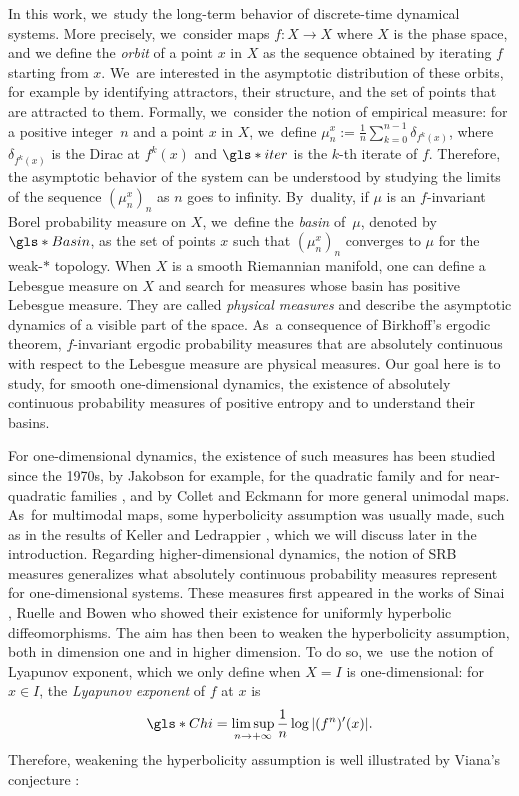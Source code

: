 \documentclass[11pt]{article}
\theoremstyle{definition}
\begin{document}
In this work, we~study the long-term behavior of discrete-time dynamical systems.
More precisely, we~consider maps $f : X \to X$ where $X$ is the phase space,
and we define the \textit{orbit} of a point $x$ in $X$ as the sequence obtained by iterating $f$ starting from $x$. We~are interested in the asymptotic distribution of these orbits, for \hbox{example} by identifying attractors, their structure, and the set of points that are attracted to them.
Formally, we~consider the notion of empirical measure: for a positive integer~$n$ and a point $x$ in $X$, we~define $\mu_n^x := \frac{1}{n} \sum_{k=0}^{n-1} \delta_{f^k(x)}$, where $\delta_{f^k(x)}$ is the Dirac at $f^k(x)$ and $\gls*{iter}$ is the $k$-th iterate of $f$.
Therefore, the asymptotic behavior of the system can be understood by studying the limits of the sequence $(\mu_n^x)_{n}$ as $n$ goes to infinity. By~duality, if $\mu$ is an $f$\nobreakdash-invariant Borel probability measure on $X$, we~define the \textit{basin} of~$\mu$, denoted by $\gls*{Basin}$, as the set of points $x$ such that $\left (\mu_n^x \right)_n$ converges to $\mu$ for the weak\nobreakdash-$*$ topology.
When $X$ is a smooth Riemannian manifold, one can define a Lebesgue measure on $X$ and search for measures whose basin has positive Lebesgue measure. They are called \textit{physical measures} and describe the asymptotic dynamics of a visible part of the space. As~a consequence of Birkhoff's ergodic theorem, $f$\nobreakdash-invariant ergodic probability measures that are absolutely continuous with respect to the Lebesgue measure are physical measures.
Our goal here is to study, for smooth one-dimensional dynamics, the existence of absolutely continuous probability measures of positive entropy and to understand their basins.

For one-dimensional dynamics, the existence of such measures has been studied since the 1970s,
by Jakobson for example, for the quadratic family \cite{Jakobson1980} and for near-quadratic families \cite{Jakobson1981}, and by Collet and Eckmann \cite{ColletEckmann} for more general unimodal maps. As~for multimodal maps, some hyperbolicity assumption was usually made, such as in the results of Keller \cite{Keller_1990} and Ledrappier \cite{Ledrappier_1981}, which we will discuss later in the introduction.
Regarding higher-dimensional dynamics, the notion of SRB measures generalizes what absolutely continuous probability measures represent for one-dimensional systems. These measures first appeared in the works of Sinai \cite{Sinai_1972}, Ruelle \cite{Ruelle_1978,Ruelle_1976} and Bowen \cite{Bowen_1975} who showed their existence for uniformly hyperbolic diffeomorphisms.
The aim has then been to weaken the hyperbolicity assumption, both in dimension one and in higher dimension.
To do so, we~use the notion of Lyapunov exponent, which we only define when $X=I$ is one-dimensional: for $x \in I$, the \textit{Lyapunov exponent} of $f$ at $x$ is
\[
\gls*{Chi} = \limsup_{n \to +\infty} \frac{1}{n} \log |(f^n)'(x)|.
\]
Therefore, weakening the hyperbolicity assumption is well illustrated by Viana's conjecture \cite{Viana1998DynamicsAP}:
\end{document}
